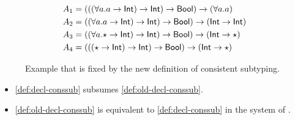 \begin{figure}[t]
  \centering
  \begin{subfigure}[b]{.4\linewidth}
  \end{subfigure}
  \begin{subfigure}[b]{.4\linewidth}
  \begin{align*}
  A_1 &=(((\forall a. a \to \mathsf{Int}) \to \mathsf{Int}) \to \mathsf{Bool}) \to (\forall a. a) \\
  A_2 &= ((\forall a. a \to \mathsf{Int}) \to \mathsf{Int}) \to \mathsf{Bool}) \to (\mathsf{Int} \to \mathsf{Int}) \\
  A_3 &= ((\forall a. \star \to \mathsf{Int}) \to \mathsf{Int}) \to \mathsf{Bool}) \to (\mathsf{Int} \to \star) \\
  A_4 &= (((\star \to \mathsf{Int}) \to \mathsf{Int}) \to \mathsf{Bool}) \to (\mathsf{Int} \to \star)
  \end{align*}
  \end{subfigure}
  \caption{Example that is fixed by the new definition of consistent subtyping.}
  \label{fig:example:c:fix}
\end{figure}

\begin{proposition}\leavevmode
  \label{prop:subsumes}
\begin{itemize}
  \item \cref{def:decl-conssub} subsumes
    \cref{def:old-decl-conssub}.
  \item \cref{def:old-decl-conssub} is equivalent to
    \cref{def:decl-conssub} in the system of \citeauthor{siek2007gradual}.
  \end{itemize}
\end{proposition}


